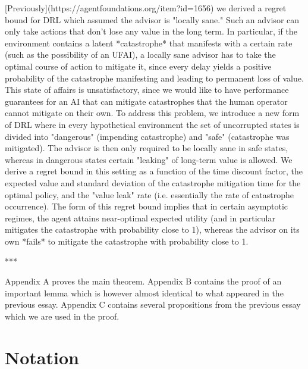 \documentclass[a4paper]{article}
\begin{document}
[Previously](https://agentfoundations.org/item?id=1656) we derived a regret bound for DRL which assumed the advisor is "locally sane." Such an advisor can only take actions that don't lose any value in the long term. In particular, if the environment contains a latent *catastrophe* that manifests with a certain rate (such as the possibility of an UFAI), a locally sane advisor has to take the optimal course of action to mitigate it, since every delay yields a positive probability of the catastrophe manifesting and leading to permanent loss of value. This state of affairs is unsatisfactory, since we would like to have performance guarantees for an AI that can mitigate catastrophes that the human operator cannot mitigate on their own. To address this problem, we introduce a new form of DRL where in every hypothetical environment the set of uncorrupted states is divided into "dangerous" (impending catastrophe) and "safe" (catastrophe was mitigated). The advisor is then only required to be locally sane in safe states, whereas in dangerous states certain "leaking" of long-term value is allowed. We derive a regret bound in this setting as a function of the time discount factor, the expected value and standard deviation of the catastrophe mitigation time for the optimal policy, and the "value leak" rate (i.e. essentially the rate of catastrophe occurrence). The form of this regret bound implies that in certain asymptotic regimes, the agent attains near-optimal expected utility (and in particular mitigates the catastrophe with probability close to 1), whereas the advisor on its own *fails* to mitigate the catastrophe with probability close to 1. %

***

Appendix A proves the main theorem. Appendix B contains the proof of an important lemma which is however almost identical to what appeared in the previous essay. Appendix C contains several propositions from the previous essay which we are used in the proof.

\section{Notation}
\end{document}
